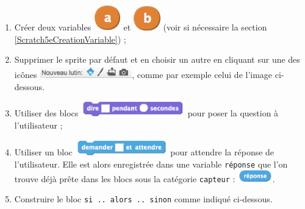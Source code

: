 \begin{enumerate}
\item Créer deux variables \includegraphics[width=.7cm]{./images/scratch02/2variableA} et \includegraphics[width=.7cm]{./images/scratch02/2variableB} (voir si nécessaire la section \vref{Scratch5eCreationVariable}) ;
\item Supprimer le sprite par défaut et en choisir un autre en cliquant sur une des icônes \includegraphics[width=4cm]{./images/scratch02/2nouveauLutin}, comme par exemple celui de l'image ci-dessous.


\item Utiliser des blocs \includegraphics[width=4.5cm]{./images/scratch02/2blocDire} pour poser la question à l'utilisateur ;

\item Utiliser un bloc \includegraphics[width=4cm]{./images/scratch02/2blocDemander} pour attendre la réponse de l'utilisateur. Elle est alors enregistrée dans une variable \texttt{réponse} que l'on trouve déjà prête dans les blocs sous la catégorie \texttt{capteur} : \includegraphics[width=1.5cm]{./images/scratch02/2reponse}.

\item Construire le bloc \texttt{si .. alors .. sinon} comme indiqué ci-dessous.

\end{enumerate}



